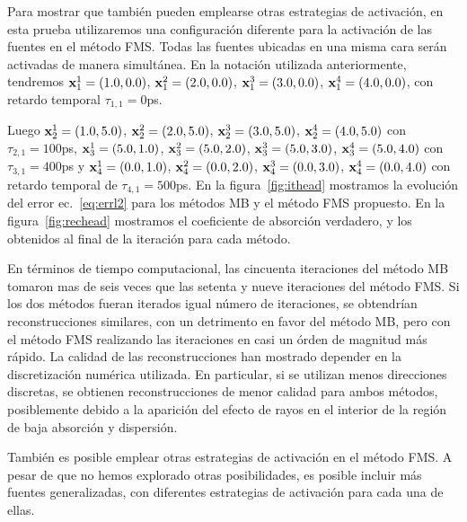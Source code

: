 Para mostrar que también pueden emplearse otras estrategias de activación, 
en esta prueba utilizaremos una configuración diferente para la 
activación de las fuentes en el método FMS. Todas las fuentes ubicadas 
en una misma cara serán activadas de manera simultánea. En la notación 
utilizada anteriormente, tendremos $\mathbf{x}_1^1=(1.0,0.0)$, 
$\mathbf{x}_1^2=(2.0,0.0)$, $\mathbf{x}_1^3=(3.0,0.0)$, $\mathbf{x}_1^4=(4.0,0.0)$, con retardo temporal $\tau_{1,1}=0$ps. 

Luego 
$\mathbf{x}_2^1=(1.0,5.0)$, 
$\mathbf{x}_2^2=(2.0,5.0)$, $\mathbf{x}_2^3=(3.0,5.0)$,  $\mathbf{x}_2^4=(4.0,5.0)$ con $\tau_{2,1}=100$ps, 
$\mathbf{x}_3^1=(5.0,1.0)$, 
$\mathbf{x}_3^2=(5.0,2.0)$, $\mathbf{x}_3^3=(5.0,3.0)$,  $\mathbf{x}_3^4=(5.0,4.0)$ con $\tau_{3,1}=400$ps 
y $\mathbf{x}_4^1=(0.0,1.0)$, 
$\mathbf{x}_4^2=(0.0,2.0)$, $\mathbf{x}_4^3=(0.0,3.0)$,  $\mathbf{x}_4^4=(0.0,4.0)$ con retardo temporal de $\tau_{4,1}=500$ps.
En la figura~\ref{fig:ithead} mostramos la evolución del error ec.~\eqref{eq:errl2} 
para los métodos MB y el método FMS propuesto. En la figura~\ref{fig:rechead} 
mostramos el coeficiente de absorción verdadero, y los obtenidos al final 
de la iteración para cada método.

En términos de tiempo computacional, las cincuenta iteraciones del método 
MB tomaron mas de seis veces que las setenta y nueve iteraciones del 
método FMS. Si los dos métodos fueran iterados igual número de iteraciones, 
se obtendrían reconstrucciones similares, con un detrimento en favor 
del método MB, pero con el método FMS realizando las iteraciones en casi un órden 
de magnitud más rápido. La calidad de las reconstrucciones han mostrado 
depender en la discretización numérica utilizada. En particular, 
si se utilizan menos direcciones discretas, se obtienen 
reconstrucciones de menor calidad para ambos métodos, 
posiblemente debido a la aparición del efecto de rayos 
en el interior de la región de baja absorción y dispersión. 

También es posible emplear otras estrategias de activación en el método 
FMS. A pesar de que no hemos explorado otras posibilidades, 
es posible incluir más fuentes generalizadas, con diferentes 
estrategias de activación para cada una de ellas. 

\pagestyle{empty}

